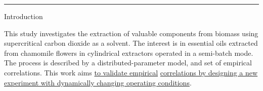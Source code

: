\documentclass[a0,portrait]{a0poster}
\begin{document}
\noindent\rule{\textwidth}{3pt}


\begin{multicols}{2} %







\begin{tcolorbox}[width=\linewidth, boxrule=0mm, sharp corners=all, colback=white]
	{\LARGE Introduction\\}

This study investigates the extraction of valuable components from biomass using supercritical carbon dioxide as a solvent. The interest is in essential oils extracted from chamomile flowers in cylindrical extractors operated in a semi-batch mode. The process is described by a distributed-parameter model, and set of empirical correlations. This work aims \underline{to validate empirical} \underline{correlations by designing a new experiment with dynamically changing operating conditions}. %
\end{tcolorbox}



\end{multicols}
\end{document}
